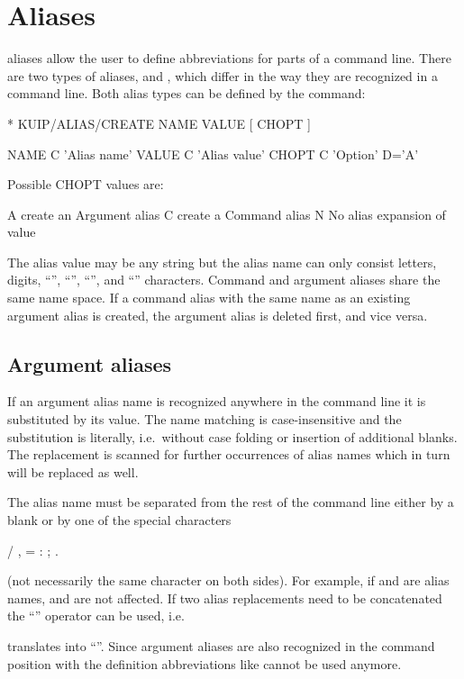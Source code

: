 %
%
\section{Aliases}

\KUIP{} aliases allow the user to define abbreviations for parts of a
command line.
There are two types of aliases,
 and , which differ
in the way they are recognized in a command line.
Both alias types can be defined by the  command:
\begin{XMP}
 * KUIP/ALIAS/CREATE NAME VALUE [ CHOPT ]

   NAME       C 'Alias name'
   VALUE      C 'Alias value'
   CHOPT      C 'Option' D='A'

   Possible CHOPT values are:

    A  create an Argument alias
    C  create a Command alias
    N  No alias expansion of value
\end{XMP}

The alias value may be any string but the alias name can only consist
letters, digits, ``\Lit{_}'', ``\Lit{-}'', ``'',
and ``\Lit{$}'' characters.
Command and argument aliases share the same name space. 
If a command alias with the same name as an existing argument alias is
created, the argument alias is deleted first, and vice versa.


\subsection{Argument aliases}

If an argument alias name is recognized anywhere
in the command line it is substituted by its value.
The name matching is case-insensitive and the substitution is literally,
i.e.\ without case folding or insertion of additional blanks.
The replacement is scanned for further occurrences of alias names which
in turn will be replaced as well.

The alias name must be separated from the rest of the
command line either by a blank or by one of the special characters
\begin{XMP}
  /  ,  =  :  ;  .  %
\end{XMP}
(not necessarily the same character on both sides).
For example, if  and  are alias names,
 and  are not affected.
If two alias replacements need to be concatenated the ``\Lit{//}''
operator can be used, i.e.\
translates into ``''.
Since argument aliases are also recognized in the command position with
the definition abbreviations like \Cind{HISTO/FIL} cannot be used anymore.


